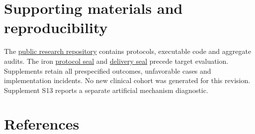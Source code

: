 \documentclass[11pt,letterpaper]{article}
\begin{document}
\section*{Supporting materials and reproducibility}

The \href{https://github.com/ziwang11112/evidence-guided-virtual-cohorts-2026}{public research repository} contains protocols, executable code and aggregate audits. The iron \href{https://github.com/ziwang11112/evidence-guided-virtual-cohorts-2026/commit/bedd845768c1c938768f58fce685f53cbf97f3df}{protocol seal} and \href{https://github.com/ziwang11112/evidence-guided-virtual-cohorts-2026/commit/c88192edeb0bc63b60d0bfe6e3a7282ced9d2975}{delivery seal} precede target evaluation. Supplements retain all prespecified outcomes, unfavorable cases and implementation incidents. No new clinical cohort was generated for this revision. Supplement S13 reports a separate artificial mechanism diagnostic.


\clearpage

\section*{References}

\begingroup
\end{document}

